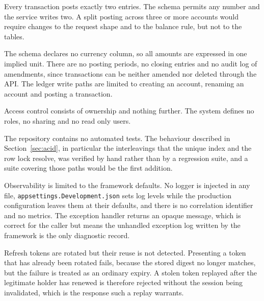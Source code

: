 \documentclass[11pt,a4paper]{article}
\newcommand{\code}[1]{\texttt{\fontsize{8.6}{10}\selectfont #1}}
\begin{document}
Every transaction posts exactly two entries. The schema permits any number and
the service writes two. A split posting across three or more accounts would
require changes to the request shape and to the balance rule, but not to the
tables.

The schema declares no currency column, so all amounts are expressed in one
implied unit. There are no posting periods, no closing entries and no audit log
of amendments, since transactions can be neither amended nor deleted through
the API. The ledger write paths are limited to creating an account, renaming an
account and posting a transaction.

Access control consists of ownership and nothing further. The system defines no
roles, no sharing and no read only users.

The repository contains no automated tests. The behaviour described in
Section~\ref{sec:acid}, in particular the interleavings that the unique index
and the row lock resolve, was verified by hand rather than by a regression
suite, and a suite covering those paths would be the first addition.

Observability is limited to the framework defaults. No logger is injected in
any file, \code{appsettings.Development.json} sets log levels while the
production configuration leaves them at their defaults, and there is no
correlation identifier and no metrics. The exception handler returns an opaque
message, which is correct for the caller but means the unhandled exception log
written by the framework is the only diagnostic record.

Refresh tokens are rotated but their reuse is not detected. Presenting a token
that has already been rotated fails, because the stored digest no longer
matches, but the failure is treated as an ordinary expiry. A stolen token
replayed after the legitimate holder has renewed is therefore rejected without
the session being invalidated, which is the response such a replay warrants.
\end{document}
